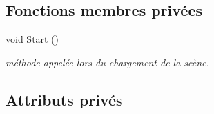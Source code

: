 \subsection*{Fonctions membres privées}
\begin{DoxyCompactItemize}
\item 
void \mbox{\hyperlink{class_parameters_aa31bc8929b4008944bd7f720bfac9a62}{Start}} ()
\begin{DoxyCompactList}\small\item\em méthode appelée lors du chargement de la scène. \end{DoxyCompactList}\end{DoxyCompactItemize}
\subsection*{Attributs privés}
